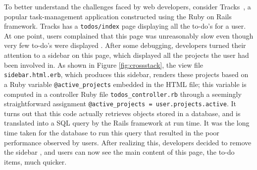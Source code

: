 To better understand the challenges faced by web developers, consider
Tracks~\cite{tracks}, a popular 
task-management application constructed using the Ruby on Rails framework. 
Tracks has a {\tt todos/index} page displaying all the to-do's
for a user. At one point, users complained that
this page was unreasonably slow even though very few to-do's were displayed \cite{tracks870}. 
After some debugging, developers turned their attention to a sidebar on this page, which displayed all the projects the user had been involved in. As shown in 
Figure \ref{fig:crossstack},
the view file {\tt sidebar.html.erb}, which produces this sidebar, renders these projects based on a Ruby variable 
{\tt @active\_projects} embedded in the HTML file; this variable is computed in 
a controller Ruby file {\tt todos\_controller.rb} through a seemingly straightforward 
assignment {\tt @active\_projects = user.projects.active}. It turns out that this code actually retrieves objects stored in a database, and is 
translated into a SQL query by the Rails
framework at run time. It was the long time taken for the database to run this query that resulted in the poor performance observed by users. 
After realizing this, developers decided to remove the sidebar , and 
users can now see the main content of this page, the to-do items, much quicker.



